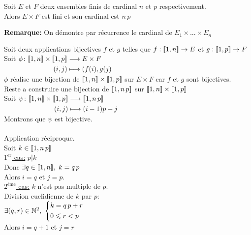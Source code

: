 \documentclass[12pt,twoside,a4paper]{article}
\author{MPSI 2}
\begin{document}
	\maketitle
	\begin{prop}
		Soit $E$ et $F$ deux ensembles finis de cardinal $n$ et $p$ respectivement.\\
		Alors $E\times F$ est fini et son cardinal est $n\,p$
	\end{prop}
	\begin{flushleft}
		\textbf{Remarque:} On d\'emontre par r\'ecurrence le cardinal de $E_1\times ...\times E_n$
	\end{flushleft}
	\begin{preuve}
		Soit deux applications bijectives $f$ et $g$ telles que $f:[\![ 1,n]\!] \rightarrow E$ et  $g:[\![ 1,p]\!]\rightarrow F$\\
		Soit $\begin{aligned}[t]\phi\colon[\![ 1,n]\!]\times [\![ 1,p]\!]&\longrightarrow E\times F \\(i,j)&\longmapsto(f(i),g(j)\end{aligned}$\\
		$\phi$ r\'ealise une bijection de $[\![ 1,n]\!]\times [\![ 1,p]\!]$ sur $E\times F$ car $f$ et $g$ sont bijectives.\\
		Reste a construire une bijection de $[\![ 1,n\,p]\!]$ sur $[\![ 1,n]\!]\times[\![ 1,p]\!]$\\
		Soit $\begin{aligned}[t]\psi\colon[\![ 1,n]\!]\times [\![ 1,p]\!]&\longrightarrow[\![ 1,n\,p]\!] \\(i,j)&\longmapsto(i-1)p+j\end{aligned}$\\
		Montrons que $\psi$ est bijective.\\
		\\
		Application r\'eciproque.\\
		Soit $k\in [\![ 1,n\,p]\!]$\\
		\underline{$1^{\text{er}}$ cas:} $p|k$\\
		Donc $\exists q\in\lbracket 1,n\rbracket,\ k=q\,p$\\
		Alors $i=q$ et $j=p$.\\
		\underline{$2^{\text{\`eme}}$ cas:} $k$ n'est pas multiple de $p$.\\
		Division euclidienne de $k$ par $p$:\\
		$\exists(q,r)\in \mathbb{N}^{2},\ \left\{
		\begin{aligned}
		& k=q\,p+r\\
		& 0\leqslant r<p
		\end{aligned}\right.$\\
		Alors $i=q+1$ et $j=r$\\

\end{preuve}
\end{document}
